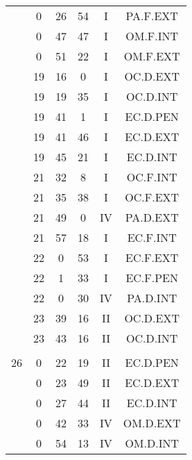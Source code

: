 \documentclass[12pt, a4paper]{article}
\begin{document}
\begin{multicols}{3}
{\begin{tabular}{c c c c c c}
	 	 	 	 & 0 & 26 & 54 & I & PA.F.EXT\\%
	 	 	 	 & 0 & 47 & 47 & I & OM.F.INT\\%
	 	 	 	 & 0 & 51 & 22 & I & OM.F.EXT\\%
	 	 	 	 & 19 & 16 & 0 & I & OC.D.EXT\\%
	 	 	 	 & 19 & 19 & 35 & I & OC.D.INT\\%
	 	 	 	 & 19 & 41 & 1 & I & EC.D.PEN\\%
	 	 	 	 & 19 & 41 & 46 & I & EC.D.EXT\\%
	 	 	 	 & 19 & 45 & 21 & I & EC.D.INT\\%
	 	 	 	 & 21 & 32 & 8 & I & OC.F.INT\\%
	 	 	 	 & 21 & 35 & 38 & I & OC.F.EXT\\%
	 	 	 	 & 21 & 49 & 0 & IV & PA.D.EXT\\%
	 	 	 	 & 21 & 57 & 18 & I & EC.F.INT\\%
	 	 	 	 & 22 & 0 & 53 & I & EC.F.EXT\\%
	 	 	 	 & 22 & 1 & 33 & I & EC.F.PEN\\%
	 	 	 	 & 22 & 0 & 30 & IV & PA.D.INT\\%
	 	 	 	 & 23 & 39 & 16 & II & OC.D.EXT\\%
	 	 	 	 & 23 & 43 & 16 & II & OC.D.INT\\%
	 	 	 	 & & & & & \\%
	 	 	 	26 & 0 & 22 & 19 & II & EC.D.PEN\\%
	 	 	 	 & 0 & 23 & 49 & II & EC.D.EXT\\%
	 	 	 	 & 0 & 27 & 44 & II & EC.D.INT\\%
	 	 	 	 & 0 & 42 & 33 & IV & OM.D.EXT\\%
	 	 	 	 & 0 & 54 & 13 & IV & OM.D.INT\\%

\end{tabular}}
\end{multicols}
\end{document}

